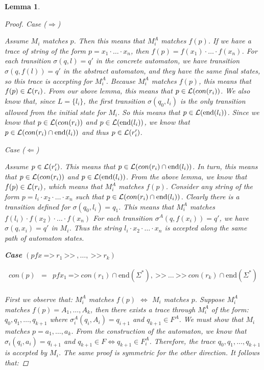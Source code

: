 \documentclass[twocolumn]{sig-alternate-10pt}
\newcommand{\Prefer}{\texttt{>>}}
\newcommand{\Path}{\texttt{=>}}
\newtheorem{lem}[thm]{Lemma}
\begin{document}
\begin{lem}
\begin{proof}
    Case ($\Rightarrow$)

    Assume $M_i$ matches $p$. Then this means that $M^A_i$ matches $f(p)$. If we have a trace of string of the form $ p = x_1 \cdot \dots \cdot x_n$, then $f(p) = f(x_1) \cdot \dots \cdot f(x_n)$. For each transition $\sigma(q,l) = q'$ in the concrete automaton, we have transition $\sigma(q,f(l)) = q'$ in the abstract automaton, and they have the same final states, so this trace is accepting for $M^A_i$. Because $M^A_i$ matches $f(p)$, this means that $f(p) \in \mathcal{L}(r_i)$. From our above lemma, this means that $p \in \mathcal{L}(con(r_i))$. We also know that, since $L = \{ l_i \}$, the first transition $\sigma(q_0,l_i)$ is the only transition allowed from the initial state for $M_i$. So this means that $p \in \mathcal{L}(\text{end}(l_i))$. Since we know that $p \in \mathcal{L}(con(r_i))$ and $p \in \mathcal{L}(\text{end}(l_i))$, we know that $p \in \mathcal{L}(con(r_i) \cap \text{end}(l_i))$ and thus $p \in \mathcal{L}(r'_i)$.

    \vspace{1em}
    Case ($\Leftarrow$)

    Assume $p \in \mathcal{L}(r'_i)$. This means that $p \in \mathcal{L}(con(r_i) \cap \text{end}(l_i))$. In turn, this means that $p \in \mathcal{L}(con(r_i))$ and $p \in \mathcal{L}(\text{end}(l_i))$. From the above lemma, we know that $f(p) \in \mathcal{L}(r_i)$, which means that $M^A_i$ matches $f(p)$. 
    Consider any string of the form $p = l_i \cdot x_2 \cdot \dots \cdot x_n$ such that $p \in \mathcal{L}(con(r_i) \cap \text{end}(l_i))$. Clearly there is a transition defined for $\sigma(q_0,l_i) = q_1$.
    This means that $M^A_i$ matches $f(l_i) \cdot f(x_2) \cdot \dots \cdot f(x_n)$
    For each transition $\sigma^A(q,f(x_i)) = q'$, we have $\sigma(q,x_i) = q'$ in $M_i$.
    Thus the string $l_i \cdot x_2 \cdot \dots \cdot x_n$ is accepted along the same path of automaton states.

  \vspace{1em}

  \textbf{Case} $(pfx ~\Path~ r_1 ~\Prefer~,\dots, ~\Prefer~ r_k)$

    \[ \begin{array}{lcl}
      con(p) &=& pfx_1 ~\Path~ con(r_1) \cap \text{end}(\Sigma^*), ~\Prefer~ \dots ~\Prefer~ con(r_k) \cap \text{end}(\Sigma^*) \\
    \end{array} \]

    First we observe that: $M^A_i$ matches $f(p)$ $\iff$ $M_i$ matches $p$.
    Suppose $M^A_i$ matches $f(p) = A_1, \dots, A_k$, then there exists a trace through $M^A_i$ of the form:%
    $q_0, q_1, \dots, q_{k+1}$
    where $\sigma^A_i(q_i, A_i) = q_{i+1}$ and $q_{k+1} \in F^A$. We must show that $M_i$ matches $p = a_1, \dots, a_k$. %
    From the construction of the automaton, we know that $\sigma_i(q_i, a_i) = q_{i+1}$ and $q_{k+1} \in F \iff q_{k+1} \in F^A_i$. Therefore, the trace $q_0, q_1, \dots, q_{k+1}$ is accepted by $M_i$. 
    The same proof is symmetric for the other direction. It follows that:


\end{proof}
\end{lem}
\end{document}
